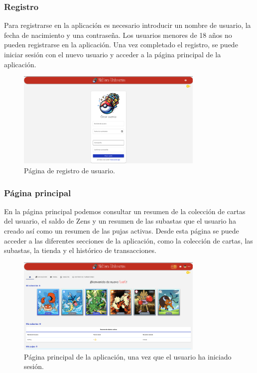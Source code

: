 \begin{enumerate}
\subsubsection{Registro}
Para registrarse en la aplicación es necesario introducir un nombre de usuario, la fecha de nacimiento y una contraseña.
Los usuarios menores de 18 años no pueden registrarse en la aplicación.
Una vez completado el registro, se puede iniciar sesión con el nuevo usuario y acceder a la página principal de la aplicación.

\begin{figure}[H]
    \centering
    \includegraphics[width=0.8\textwidth]{figures/6-Analisis/6-Interfaz/interfaz/signup.png}
    \caption{Página de registro de usuario.}
    \label{fig:m-interfaz-registro}
\end{figure}


\subsubsection{Página principal}
En la página principal podemos consultar un resumen de la colección de cartas del usuario, el saldo de Zens y un resumen
de las subastas que el usuario ha creado así como un resumen de las pujas activas.
Desde esta página se puede acceder a las diferentes secciones de la aplicación, como la colección de cartas, las subastas, la tienda
y el histórico de transacciones.

\begin{figure}[H]
    \centering
    \includegraphics[width=0.8\textwidth]{figures/6-Analisis/6-Interfaz/interfaz/logued.png}
    \caption{Página principal de la aplicación, una vez que el usuario ha iniciado sesión.}
    \label{fig:m-interfaz-logued}
\end{figure}


\end{enumerate}
